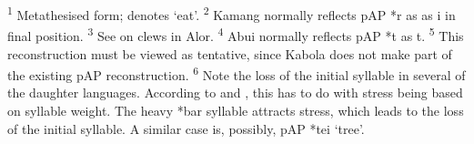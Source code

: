 \textsuperscript{1} Metathesised form; denotes `eat'.  \textsuperscript{2} Kamang normally\textsuperscript{} reflects pAP *r as as i in final position.  \textsuperscript{3} See \citet{Rodemeier1992} on clews in Alor.  \textsuperscript{4} Abui normally reflects pAP *t as t.  \textsuperscript{5} This reconstruction must be viewed as tentative, since Kabola does not make part of the existing pAP reconstruction.  \textsuperscript{6} Note the loss of the initial syllable in several of the daughter languages. According to \citet{HoltonEtAl2012} and \citet{HoltonRobinsonTV}, this has to do with stress being based on syllable weight. The heavy *bar syllable attracts stress, which leads to the loss of the initial syllable. A similar case is, possibly, pAP *tei `tree'.





